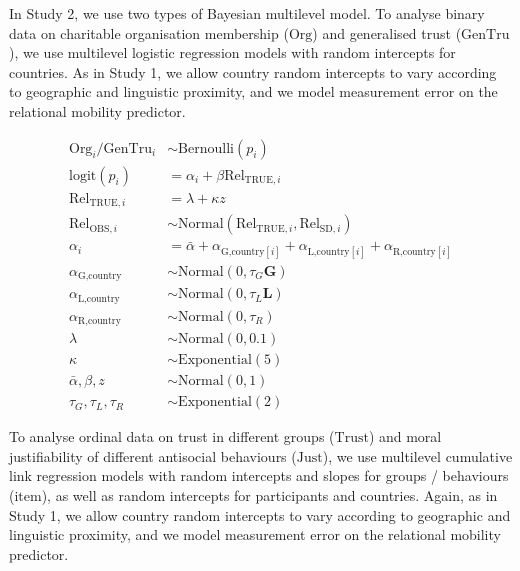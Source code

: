 \documentclass[english,man,floatsintext]{apa6}
\begin{document}
In Study 2, we use two types of Bayesian multilevel model. To analyse binary data on charitable organisation membership (\(\text{Org}\)) and generalised trust (\(\text{GenTru}\)), we use multilevel logistic regression models with random intercepts for countries. As in Study 1, we allow country random intercepts to vary according to geographic and linguistic proximity, and we model measurement error on the relational mobility predictor.

\[
\begin{aligned}
\text{Org}_{i}/\text{GenTru}_{i} &\sim \text{Bernoulli}(p_{i}) \\
\text{logit}(p_{i}) &= \alpha_{i} + \beta\text{Rel}_{\text{TRUE},i} \\
\text{Rel}_{\text{TRUE},i} &= \lambda + \kappa z \\
\text{Rel}_{\text{OBS},i} &\sim \text{Normal}(\text{Rel}_{\text{TRUE},i}, \text{Rel}_{\text{SD},i}) \\
\alpha_{i} &= \bar{\alpha} + \alpha_{\text{G,country}[i]} + \alpha_{\text{L,country}[i]} + \alpha_{\text{R,country}[i]} \\
\alpha_{\text{G,country}} &\sim \text{Normal}(0, \tau_{G} \textbf{G}) \\
\alpha_{\text{L,country}} &\sim \text{Normal}(0, \tau_{L} \textbf{L}) \\
\alpha_{\text{R,country}} &\sim \text{Normal}(0, \tau_{R}) \\
\lambda &\sim \text{Normal}(0, 0.1) \\
\kappa &\sim \text{Exponential}(5) \\
\bar{\alpha},\beta,z &\sim \text{Normal}(0, 1)\\
\tau_{G},\tau_{L},\tau_{R} &\sim \text{Exponential}(2)
\end{aligned}
\]

To analyse ordinal data on trust in different groups (\(\text{Trust}\)) and moral justifiability of different antisocial behaviours (\(\text{Just}\)), we use multilevel cumulative link regression models with random intercepts and slopes for groups / behaviours (\(\text{item}\)), as well as random intercepts for participants and countries. Again, as in Study 1, we allow country random intercepts to vary according to geographic and linguistic proximity, and we model measurement error on the relational mobility predictor.
\end{document}
